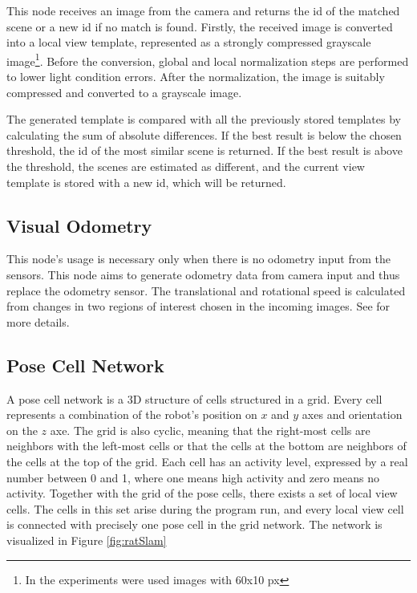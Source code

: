 This node receives an image from the camera and returns the id of the matched scene or a new id if no match is found. Firstly, the received image is converted into a local view template, represented as a strongly compressed grayscale image\footnote{In the experiments were used images with 60x10 px}. Before the conversion, global and local normalization steps are performed to lower light condition errors. After the normalization, the image is suitably compressed and converted to a grayscale image.\par
The generated template is compared with all the previously stored templates by calculating the sum of absolute differences. If the best result is below the chosen threshold, the id of the most similar scene is returned. If the best result is above the threshold, the scenes are estimated as different, and the current view template is stored with a new id, which will be returned.

\subsection{Visual Odometry}\label{section:visOdom}

This node's usage is necessary only when there is no odometry input from the sensors. This node aims to generate odometry data from camera input and thus replace the odometry sensor. The translational and rotational speed is calculated from changes in two regions of interest chosen in the incoming images. See \cite{RatSLAMExp2} for more details.

\subsection{Pose Cell Network}\label{section:poseCellsNet}

A pose cell network is a 3D structure of cells structured in a grid. Every cell represents a combination of the robot's position on $x$ and $y$ axes and orientation on the $z$ axe. The grid is also cyclic, meaning that the right-most cells are neighbors with the left-most cells or that the cells at the bottom are neighbors of the cells at the top of the grid. Each cell has an activity level, expressed by a real number between 0 and 1, where one means high activity and zero means no activity. Together with the grid of the pose cells, there exists a set of local view cells. The cells in this set arise during the program run, and every local view cell is connected with precisely one pose cell in the grid network. The network is visualized in Figure \ref{fig:ratSlam}\par

